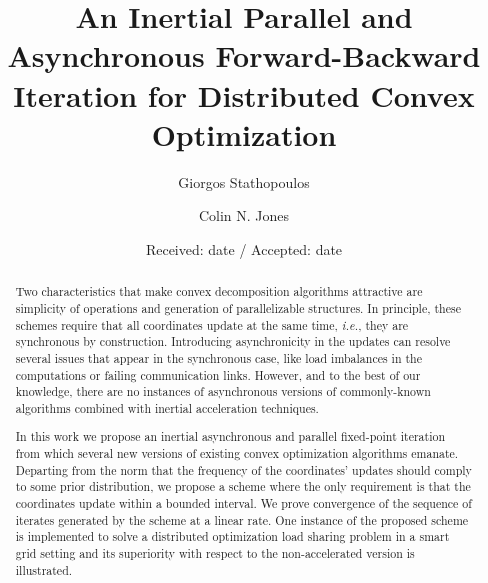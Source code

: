\documentclass[envcountsect]{svjour3}
\newcommand{\ie}{{\it i.e.}}
\begin{document}
\title{An Inertial Parallel and Asynchronous Forward-Backward Iteration for Distributed Convex Optimization}

\subtitle{}

\author{Giorgos Stathopoulos   \and  Colin N. Jones }


\date{Received: date / Accepted: date}

\maketitle

\begin{abstract}
Two characteristics that make convex decomposition algorithms attractive are simplicity of operations and generation of parallelizable structures.
In principle, these schemes require that all coordinates update at the same time, \ie, they are synchronous by construction.
Introducing asynchronicity in the updates can resolve several issues that appear in the synchronous case, like load imbalances in the computations or
failing communication links. However, and to the best of our knowledge,
there are no instances of asynchronous versions of commonly-known algorithms combined with inertial acceleration techniques.

In this work we propose an inertial asynchronous and parallel fixed-point iteration from which several new versions of existing convex optimization
algorithms emanate. Departing from the norm that the frequency of the coordinates' updates should comply to some prior distribution, we propose a scheme where the only requirement is that the coordinates update within a bounded interval. We prove convergence of the sequence of iterates generated by the scheme at a linear rate. One instance of the proposed scheme is implemented to solve a distributed optimization load sharing problem in a smart grid setting and its superiority with respect to the non-accelerated version is illustrated.
\end{abstract}
\end{document}
